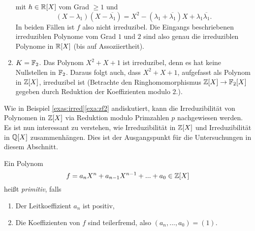 \documentclass{book}
\begin{document}
\begin{exas}
\begin{enumerate}
            mit $h \in \mathbb{R}[X]$ vom Grad $\ge 1$ und 
            \[
                (X- \lambda_1) (X - \overline{\lambda_1}) = X^2 - (\lambda_1 + \overline{\lambda_1}) X + \lambda_1 \overline{\lambda_1}.
            \]
            In beiden Fällen ist $f$ also nicht irreduzibel. Die Eingangs
            beschriebenen irreduziblen Polynome vom Grad $1$ und $2$ sind also
            genau die irreduziblen Polynome in $\mathbb{R}[X]$ (bis auf
            Assoziiertheit).
        \item\label{exa:zf2} $K = \mathbb{F}_2$. Das Polynom $X^2 + X + 1$ ist irreduzibel, denn es
            hat keine Nullstellen in $\mathbb{F}_2$. Daraus folgt auch, dass $X^2 + X
            + 1$, aufgefasst als Polynom in $\mathbb{Z}[X]$, irreduzibel ist (Betrachte
            den Ringhomomorphismus $\mathbb{Z}[X] \to \mathbb{F}_2[X]$ gegeben durch
            Reduktion der Koeffizienten modulo $2$.).
    \end{enumerate}
\end{exas}

Wie in Beispiel \ref{exas:irred}\ref{exa:zf2} andiskutiert, kann die
Irreduzibilität von Polynomen in $\mathbb{Z}[X]$ via Reduktion modulo
Primzahlen $p$ nachgewiesen werden. Es ist nun interessant zu verstehen, wie
Irreduzibilität in $\mathbb{Z}[X]$ und Irreduzibilität in $\mathbb{Q}[X]$ zusammenhängen.
Dies ist der Ausgangspunkt für die Untersuchungen in diesem Abschnitt. 

\begin{defi}
    \label{defi:primitiv}
    Ein Polynom
    \[
        f = a_n X^n + a_{n-1} X^{n-1} + ... + a_0 \in \mathbb{Z}[X]
    \]
    heißt \emph{primitiv}, falls
    \begin{enumerate}[label=\arabic * .]
        \item Der Leitkoeffizient $a_n$ ist positiv,
        \item Die Koeffizienten von $f$ sind teilerfremd, also $(a_n,...,a_0) = (1)$.
    \end{enumerate}
\end{defi}
\end{document}
